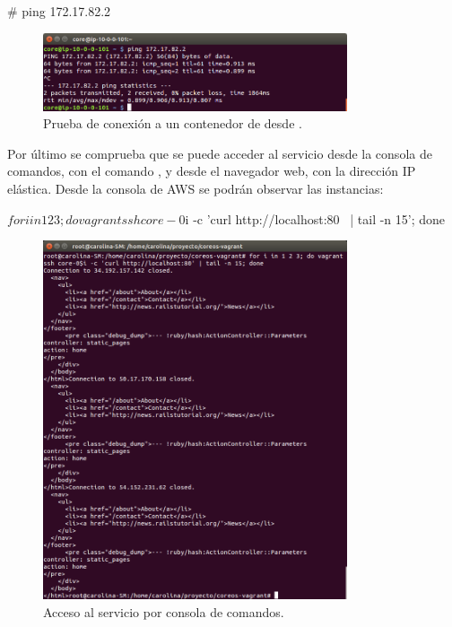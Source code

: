 \begin{code}
# ping 172.17.82.2
\end{code}

\begin{figure}[H]
\centering
\includegraphics[width=0.8\textwidth]{images/figures/ping-1.png}
\caption{Prueba de conexión a un contenedor de  desde .}
\end{figure}

Por último se comprueba que se puede acceder al servicio desde la consola de comandos, con el comando , y desde el navegador web, con la dirección IP elástica. Desde la consola de AWS se podrán observar las instancias: 

\begin{code}
$ for i in 1 2 3; do vagrant ssh core-0$i -c 'curl http://localhost:80 \
  | tail -n 15'; done
\end{code}

\begin{figure}[H]
\centering
\includegraphics[width=0.8\textwidth]{images/figures/curl-aws-3.png}
\caption{Acceso al servicio por consola de comandos.}
\end{figure}

